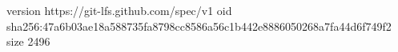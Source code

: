 version https://git-lfs.github.com/spec/v1
oid sha256:47a6b03ae18a588735fa8798cc8586a56c1b442e8886050268a7fa44d6f749f2
size 2496
